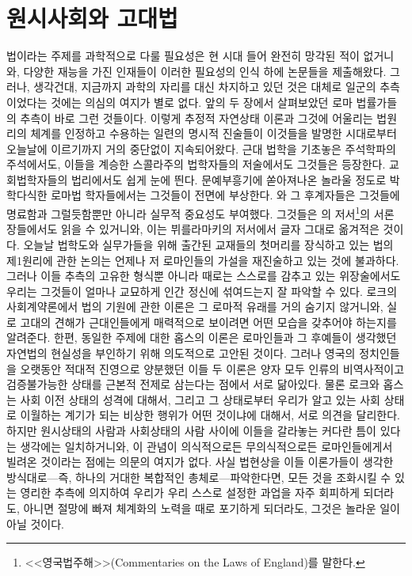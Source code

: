 \chapter{원시사회와 고대법}

법이라는 주제를 과학적으로 다룰 필요성은 현 시대 들어
완전히 망각된 적이 없거니와,
다양한 재능을 가진 인재들이
이러한 필요성의 인식 하에 논문들을 제출해왔다.
그러나, 생각건대,
지금까지 과학의 자리를 대신 차지하고 있던 것은
대체로 일군의 추측이었다는 것에는 의심의 여지가 별로 없다.
앞의 두 장에서 살펴보았던 로마 법률가들의 추측이 바로 그런 것들이다.
이렇게 추정적 자연상태 이론과
그것에 어울리는 법원리의 체계를 인정하고 수용하는 일련의 명시적 진술들이
이것들을 발명한 시대로부터 오늘날에 이르기까지 거의 중단없이 지속되어왔다.
근대 법학을 기초놓은 주석학파의 주석에서도,
이들을 계승한 스콜라주의 법학자들의 저술에서도 그것들은 등장한다.
교회법학자들의 법리에서도 쉽게 눈에 띈다.
문예부흥기에 쏟아져나온 놀라울 정도로 박학다식한
로마법 학자들에서는
그것들이 전면에 부상한다.
와 그 후계자들은 그것들에 명료함과 그럴듯함뿐만 아니라
실무적 중요성도 부여했다.
그것들은 의 저서\footnote{%
  <<영국법주해>>(Commentaries on the Laws of England)를 말한다.
}의 서론 장들에서도 읽을 수 있거니와,
이는 뷔를라마키의 저서에서
글자 그대로 옮겨적은 것이다.
오늘날 법학도와 실무가들을 위해 출간된 교재들의 첫머리를 장식하고 있는
법의 제1원리에 관한 논의는 언제나 저 로마인들의 가설을
재진술하고 있는 것에 불과하다.
그러나 이들 추측의 고유한 형식뿐 아니라
때로는 스스로를 감추고 있는 위장술에서도
우리는 그것들이 얼마나 교묘하게 인간 정신에 섞여드는지 잘 파악할 수 있다.
로크의 사회계약론에서 법의 기원에 관한 이론은
그 로마적 유래를 거의 숨기지 않거니와,
실로 고대의 견해가 근대인들에게 매력적으로 보이려면
어떤 모습을 갖추어야 하는지를 알려준다.
한편, 동일한 주제에 대한 홉스의 이론은
로마인들과 그 후예들이 생각했던 자연법의 현실성을
부인하기 위해 의도적으로 고안된 것이다.
그러나 영국의 정치인들을 오랫동안 적대적 진영으로 양분했던
이들 두 이론은 양자 모두 인류의 비역사적이고 검증불가능한 상태를
근본적 전제로 삼는다는 점에서 서로 닮아있다.
물론 로크와 홉스는 사회 이전 상태의 성격에 대해서, 그리고
그 상태로부터 우리가 알고 있는 사회 상태로 이월하는 계기가 되는
비상한 행위가 어떤 것이냐에 대해서, 서로 의견을 달리한다.
하지만 원시상태의 사람과 사회상태의 사람 사이에
이들을 갈라놓는 커다란 틈이 있다는 생각에는 일치하거니와,
이 관념이 의식적으로든 무의식적으로든
로마인들에게서 빌려온 것이라는 점에는 의문의 여지가 없다.
사실 법현상을 이들 이론가들이 생각한 방식대로---즉, 하나의 거대한
복합적인 총체로---파악한다면, 
모든 것을 조화시킬 수 있는 영리한 추측에 의지하여
우리가 우리 스스로 설정한 과업을 자주 회피하게 되더라도,
아니면 절망에 빠져 체계화의 노력을 때로 포기하게 되더라도,
그것은 놀라운 일이 아닐 것이다.

